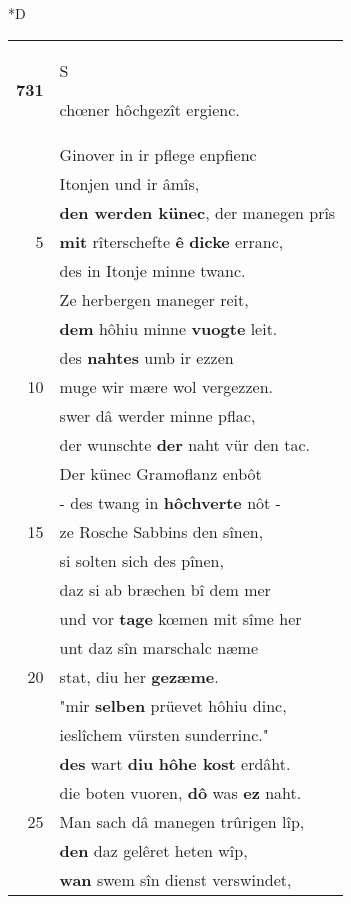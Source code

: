 \documentclass[8pt,a4paper,notitlepage]{article}
\begin{document}
\begin{table}[ht]
\begin{minipage}[t]{0.5\linewidth}
\small
\begin{center}*D
\end{center}
\begin{tabular}{rl}
\textbf{731} & \begin{large}S\end{large}chœner hôchgezît ergienc.\\ 
 & Ginover in ir pflege enpfienc\\ 
 & Itonjen und ir âmîs,\\ 
 & \textbf{den werden künec}, der manegen prîs\\ 
5 & \textbf{mit} rîterschefte \textbf{ê} \textbf{dicke} erranc,\\ 
 & des in Itonje minne twanc.\\ 
 & Ze herbergen maneger reit,\\ 
 & \textbf{dem} hôhiu minne \textbf{vuogte} leit.\\ 
 & des \textbf{nahtes} umb ir ezzen\\ 
10 & muge wir mære wol vergezzen.\\ 
 & swer dâ werder minne pflac,\\ 
 & der wunschte \textbf{der} naht vür den tac.\\ 
 & Der künec Gramoflanz enbôt\\ 
 & - des twang in \textbf{hôchverte} nôt -\\ 
15 & ze Rosche Sabbins den sînen,\\ 
 & si solten sich des pînen,\\ 
 & daz si ab bræchen bî dem mer\\ 
 & und vor \textbf{tage} kœmen mit sîme her\\ 
 & unt daz sîn marschalc næme\\ 
20 & stat, diu her \textbf{gezæme}.\\ 
 & "mir \textbf{selben} prüevet hôhiu dinc,\\ 
 & ieslîchem vürsten sunderrinc."\\ 
 & \textbf{des} wart \textbf{diu} \textbf{hôhe kost} erdâht.\\ 
 & die boten vuoren, \textbf{dô} was \textbf{ez} naht.\\ 
25 & Man sach dâ manegen trûrigen lîp,\\ 
 & \textbf{den} daz gelêret heten wîp,\\ 
 & \textbf{wan} swem sîn dienst verswindet,\\ 

\end{tabular}
\end{minipage}
\end{table}
\end{document}
